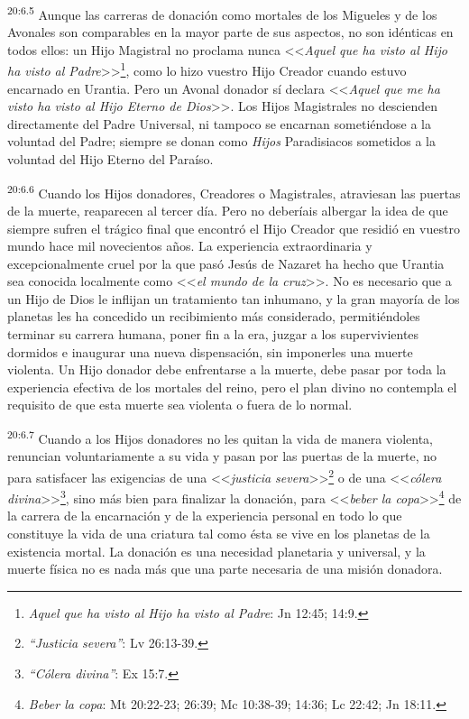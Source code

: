 \par
\textsuperscript{20:6.5} Aunque las carreras de donación como mortales de los Migueles y de los Avonales son comparables en la mayor parte de sus aspectos, no son idénticas en todos ellos: un Hijo Magistral no proclama nunca <<\textit{Aquel que ha visto al Hijo ha visto al Padre}>>\footnote{\textit{Aquel que ha visto al Hijo ha visto al Padre}: Jn 12:45; 14:9.}, como lo hizo vuestro Hijo Creador cuando estuvo encarnado en Urantia. Pero un Avonal donador sí declara <<\textit{Aquel que me ha visto ha visto al Hijo Eterno de Dios}>>. Los Hijos Magistrales no descienden directamente del Padre Universal, ni tampoco se encarnan sometiéndose a la voluntad del Padre; siempre se donan como \textit{Hijos} Paradisiacos sometidos a la voluntad del Hijo Eterno del Paraíso.

\par
\textsuperscript{20:6.6} Cuando los Hijos donadores, Creadores o Magistrales, atraviesan las puertas de la muerte, reaparecen al tercer día. Pero no deberíais albergar la idea de que siempre sufren el trágico final que encontró el Hijo Creador que residió en vuestro mundo hace mil novecientos años. La experiencia extraordinaria y excepcionalmente cruel por la que pasó Jesús de Nazaret ha hecho que Urantia sea conocida localmente como <<\textit{el mundo de la cruz}>>. No es necesario que a un Hijo de Dios le inflijan un tratamiento tan inhumano, y la gran mayoría de los planetas les ha concedido un recibimiento más considerado, permitiéndoles terminar su carrera humana, poner fin a la era, juzgar a los supervivientes dormidos e inaugurar una nueva dispensación, sin imponerles una muerte violenta. Un Hijo donador debe enfrentarse a la muerte, debe pasar por toda la experiencia efectiva de los mortales del reino, pero el plan divino no contempla el requisito de que esta muerte sea violenta o fuera de lo normal.

\par
\textsuperscript{20:6.7} Cuando a los Hijos donadores no les quitan la vida de manera violenta, renuncian voluntariamente a su vida y pasan por las puertas de la muerte, no para satisfacer las exigencias de una <<\textit{justicia severa}>>\footnote{\textit{``Justicia severa''}: Lv 26:13-39.} o de una <<\textit{cólera divina}>>\footnote{\textit{``Cólera divina''}: Ex 15:7.}, sino más bien para finalizar la donación, para <<\textit{beber la copa}>>\footnote{\textit{Beber la copa}: Mt 20:22-23; 26:39; Mc 10:38-39; 14:36; Lc 22:42; Jn 18:11.} de la carrera de la encarnación y de la experiencia personal en todo lo que constituye la vida de una criatura tal como ésta se vive en los planetas de la existencia mortal. La donación es una necesidad planetaria y universal, y la muerte física no es nada más que una parte necesaria de una misión donadora.

